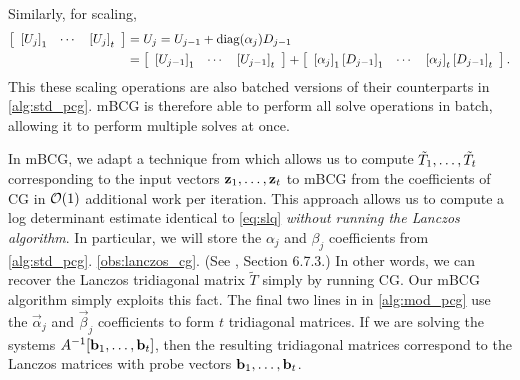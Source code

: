 Similarly, for scaling,
%
\begin{align*}
  \left[ \begin{array}{ccc}
    \left[U_j \right]_1 & \cdots & \left[ U_j \right]_t
  \end{array} \right]
  &=
  U_j = U_{j-1} + \text{diag}(\alpha_j) D_{j-1}
  \\
  &=
  \left[ \begin{array}{ccc}
    \left[U_{j-1} \right]_1 & \cdots & \left[ U_{j-1} \right]_t
  \end{array} \right]
  +
  \left[ \begin{array}{ccc}
    \left[ \alpha_{j} \right]_1 \left[D_{j-1} \right]_1 & \cdots & \left[ \alpha_{j} \right]_t \left[ D_{j-1} \right]_t
  \end{array} \right].
\end{align*}
%
This these scaling operations are also batched versions of their counterparts in \autoref{alg:std_pcg}.
mBCG is therefore able to perform all solve operations in batch, allowing it to perform multiple solves at once.

In mBCG, we adapt a technique from \citet{saad2003iterative} which allows us to compute $\tilde{T}_{1},\ldots,\tilde{T}_{t}$ corresponding to the input vectors $\mathbf{z}_{1},\ldots,\mathbf{z}_{t}$  to mBCG from the coefficients of CG in $\bigo{1}$ additional work per iteration.
This approach allows us to compute a log determinant estimate identical to \eqref{eq:slq} \emph{without running the Lanczos algorithm}.
In particular, we will store the $\alpha_j$ and $\beta_j$ coefficients from \autoref{alg:std_pcg}.
\cref{obs:lanczos_cg}.
(See \cite{saad2003iterative}, Section 6.7.3.)
In other words, we can recover the Lanczos tridiagonal matrix $\tilde T$ simply by running CG.
Our mBCG algorithm simply exploits this fact.
The final two lines in {\color{\colornew} } in \autoref{alg:mod_pcg} use the $\vec \alpha_j$ and $\vec \beta_j$ coefficients to form $t$ tridiagonal matrices.
If we are solving the systems $A^{-1}[\mathbf{b}_1, \ldots, \mathbf{b}_t]$, then the resulting tridiagonal matrices correspond to the Lanczos matrices with probe vectors $\mathbf{b}_1, \ldots, \mathbf{b}_t$.




